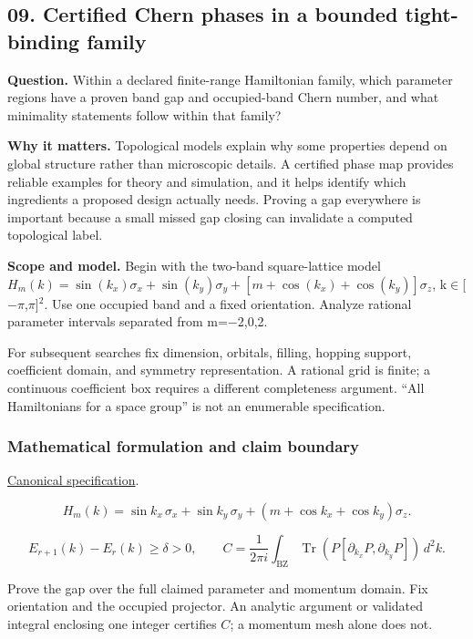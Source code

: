 \documentclass[
  11pt,
]{article}
\begin{document}
\subsection{09. Certified Chern phases in a bounded tight-binding
family}

\textbf{Question.} Within a declared finite-range Hamiltonian family,
which parameter regions have a proven band gap and occupied-band Chern
number, and what minimality statements follow within that family?

\textbf{Why it matters.} Topological models explain why some properties
depend on global structure rather than microscopic details. A certified
phase map provides reliable examples for theory and simulation, and it
helps identify which ingredients a proposed design actually needs.
Proving a gap everywhere is important because a small missed gap closing
can invalidate a computed topological label.

\textbf{Scope and model.} Begin with the two-band square-lattice model
\(H_m(k)=\sin(k_x)\sigma_x+\sin(k_y)\sigma_y+[m+\cos(k_x)+\cos(k_y)]\sigma_z\),
k\ensuremath{\in}[\ensuremath{-}\ensuremath{\pi},\ensuremath{\pi}]\ensuremath{{}^{2}}.
Use one occupied band and a fixed orientation. Analyze rational
parameter intervals separated from m=\ensuremath{-}2,0,2.

For subsequent searches fix dimension, orbitals, filling, hopping
support, coefficient domain, and symmetry representation. A rational
grid is finite; a continuous coefficient box requires a different
completeness argument. ``All Hamiltonians for a space group'' is not an
enumerable specification.

\subsubsection{Mathematical formulation and claim boundary}

\href{https://github.com/rick-stevens-ai/Pure-Thought/blob/main/PRDs/09-Topological-Band-Theory.md}{Canonical
specification}.

\[H_m(k)=\sin k_x\,\sigma_x+\sin k_y\,\sigma_y+
(m+\cos k_x+\cos k_y)\sigma_z.\]

\[E_{r+1}(k)-E_r(k)\ge\delta>0,\qquad
C=\frac{1}{2\pi i}\int_{\mathrm{BZ}}
\operatorname{Tr}\!\left(P[\partial_{k_x}P,\partial_{k_y}P]\right)\,d^2k.\]

Prove the gap over the full claimed parameter and momentum domain. Fix
orientation and the occupied projector. An analytic argument or
validated integral enclosing one integer certifies \(C\); a momentum
mesh alone does not.
\end{document}
